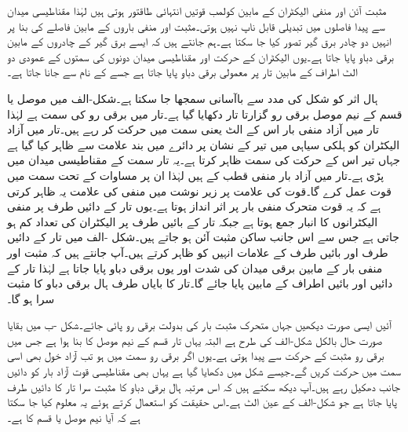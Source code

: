 مثبت آئن اور منفی الیکٹران کے مابین کولمب قوتیں انتہائی طاقتور ہوتی ہیں لہٰذا مقناطیسی میدان سے پیدا فاصلوں میں تبدیلی قابل ناپ نہیں ہوتی۔مثبت اور منفی باروں کے مابین فاصلے کی بنا پر انہیں دو چادر برق گیر  تصور کیا جا سکتا ہے۔ہم جانتے ہیں کہ ایسے برق گیر  کے چادروں کے مابین برقی دباو پایا جاتا ہے۔یوں الیکٹران کے حرکت اور مقناطیسی میدان دونوں کی سمتوں کے عمودی دو الٹ اطراف کے مابین تار پر معمولی برقی دباو پایا جاتا ہے جسے  کے نام سے جانا جاتا ہے۔

ہال اثر کو شکل  کی مدد سے باآسانی سمجھا جا سکتا ہے۔شکل-الف میں موصل یا  قسم کے نیم موصل برقی رو گزارتا تار دکھایا گیا ہے۔تار میں برقی رو  کی سمت  ہے  لہٰذا تار میں آزاد منفی بار اس کے الٹ یعنی  سمت  میں حرکت کر رہے ہیں۔تار میں آزاد الیکٹران کو ہلکی سیاہی میں تیر کے نشان پر دائرے میں بند  علامت سے ظاہر کیا گیا ہے جہاں تیر اس کے حرکت کی سمت ظاہر کرتا ہے۔یہ تار  سمت کے مقناطیسی میدان میں پڑی ہے۔تار میں آزاد بار منفی قطب کے ہیں لہٰذا ان پر مساوات  کے تحت  سمت میں قوت  عمل کرے گا۔قوت کی علامت پر زیر نوشت میں منفی کی علامت یہ ظاہر کرتی ہے کہ یہ قوت متحرک منفی بار پر اثر انداز ہوتا ہے۔یوں تار کے دائیں طرف پر منفی الیکٹرانوں کا انبار جمع ہوتا ہے جبکہ تار کے بائیں طرف پر الیکٹران کی تعداد کم ہو جاتی ہے جس سے اس جانب ساکن مثبت آئن  ہو جاتے ہیں۔شکل -الف میں تار کے دائیں طرف  اور بائیں طرف   کے علامات انہیں کو ظاہر کرتے ہیں۔آپ جانتے ہیں کہ مثبت اور  منفی بار  کے مابین برقی میدان کی شدت  اور یوں برقی دباو پایا جاتا ہے لہٰذا تار کے دائیں اور بائیں اطراف کے مابین  پایا جائے گا۔تار کا بایاں طرف ہال برقی دباو کا مثبت سرا ہو گا۔

آئیں ایسی صورت دیکھیں جہاں متحرک مثبت بار کی بدولت برقی رو پائی جائے۔شکل -ب میں بقایا صورت حال بالکل شکل-الف کی طرح ہے البتہ یہاں تار  قسم کے نیم موصل کا بنا ہوا ہے جس میں برقی رو مثبت  کے حرکت سے پیدا ہوتی ہے۔یوں اگر برقی رو  سمت میں ہو تب آزاد خول بھی اسی سمت میں حرکت کریں گے۔جیسے شکل میں دکھایا گیا ہے یہاں بھی مقناطیسی قوت آزاد بار کو دائیں جانب دھکیل رہے ہیں۔آپ دیکھ سکتے ہیں کہ اس مرتبہ ہال برقی دباو کا مثبت سرا تار کا دائیں طرف پایا جاتا ہے جو شکل-الف کے عین الٹ ہے۔اس حقیقت کو استعمال کرتے ہوئے یہ معلوم کیا جا سکتا ہے کہ آیا  نیم موصل  یا  قسم کا ہے۔

